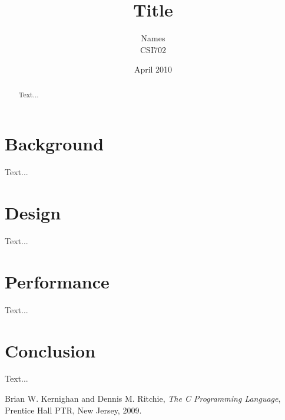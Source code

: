 \documentclass{article}
\begin{document}
\title{Title}
\author{Names\\
        CSI702}
\date{April 2010}
\maketitle

\begin{abstract}
Text...
\end{abstract}

\tableofcontents

\section{Background}
Text...

\section{Design}
Text...

\section{Performance}
Text...

\section{Conclusion}
Text...

\begin{thebibliography}{9}

  Brian W. Kernighan and Dennis M. Ritchie,
  \emph{The C Programming Language},
  Prentice Hall PTR, New Jersey,
  2009.

\end{thebibliography}
\end{document}
